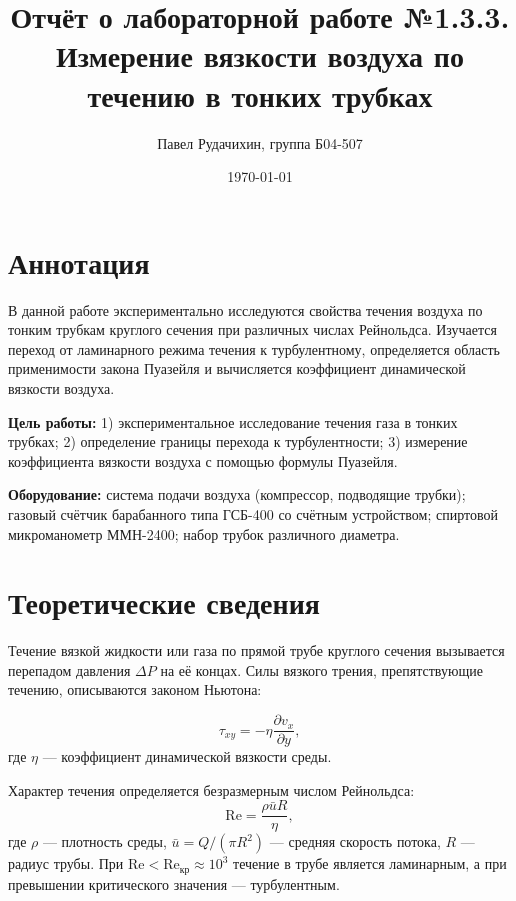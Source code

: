 \documentclass[14pt]{article}
\title{Отчёт о лабораторной работе №1.3.3. \\ \textbf{Измерение вязкости воздуха по течению в тонких трубках}}
\author{Павел Рудачихин, группа Б04-507}
\date{\today}
\begin{document}
\maketitle

\section*{Аннотация}

\hspace{4mm} В данной работе экспериментально исследуются свойства течения воздуха по тонким трубкам круглого сечения при различных числах Рейнольдса. Изучается переход от ламинарного режима течения к турбулентному, определяется область применимости закона Пуазейля и вычисляется коэффициент динамической вязкости воздуха.

\textbf{Цель работы:} 1) экспериментальное исследование течения газа в тонких трубках; 2) определение границы перехода к турбулентности; 3) измерение коэффициента вязкости воздуха с помощью формулы Пуазейля.

\textbf{Оборудование:} система подачи воздуха (компрессор, подводящие трубки); газовый счётчик барабанного типа ГСБ-400 со счётным устройством; спиртовой микроманометр ММН-2400; набор трубок различного диаметра.

\section*{Теоретические сведения}

\hspace{4mm} Течение вязкой жидкости или газа по прямой трубе круглого сечения вызывается перепадом давления $\Delta P$ на её концах. Силы вязкого трения, препятствующие течению, описываются законом Ньютона:

\begin{equation}
	\tau_{xy} = -\eta \frac{\partial v_x}{\partial y},
\end{equation}
где $\eta$ — коэффициент динамической вязкости среды.

Характер течения определяется безразмерным числом Рейнольдса:
\begin{equation}
	\text{Re} = \frac{\rho \bar{u} R}{\eta},
\end{equation}
где $\rho$ — плотность среды, $\bar{u} = Q/(\pi R^2)$ — средняя скорость потока, $R$ — радиус трубы. При $\text{Re} < \text{Re}_{\text{кр}} \approx 10^3$ течение в трубе является ламинарным, а при превышении критического значения — турбулентным.
\end{document}
